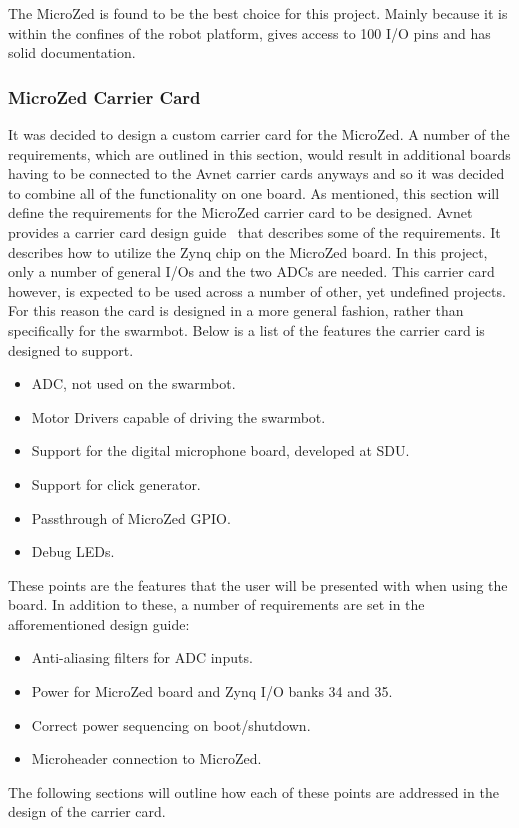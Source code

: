 The MicroZed is found to be the best choice for this project.
Mainly because it is within the confines of the robot platform, gives access to 100 I/O pins and has solid documentation.

\subsubsection*{MicroZed Carrier Card}
It was decided to design a custom carrier card for the MicroZed.
A number of the requirements, which are outlined in this section, would result in additional boards having to be connected to the Avnet carrier cards anyways and so it was decided to combine all of the functionality on one board.
As mentioned, this section will define the requirements for the MicroZed carrier card to be designed.
Avnet provides a carrier card design guide~\cite{design_carrier} that describes some of the requirements.
It describes how to utilize the Zynq chip on the MicroZed board.
In this project, only a number of general I/Os and the two ADCs are needed.
This carrier card however, is expected to be used across a number of other, yet undefined projects.
For this reason the card is designed in a more general fashion, rather than specifically for the swarmbot.
Below is a list of the features the carrier card is designed to support.

\begin{itemize}
	\item ADC, not used on the swarmbot.
	\item Motor Drivers capable of driving the swarmbot.
	\item Support for the digital microphone board, developed at SDU.
	\item Support for click generator.
	\item Passthrough of MicroZed GPIO.
	\item Debug LEDs.
\end{itemize}

These points are the features that the user will be presented with when using the board.
In addition to these, a number of requirements are set in the afforementioned design guide:

\begin{itemize}
	\item Anti-aliasing filters for ADC inputs.
	\item Power for MicroZed board and Zynq I/O banks 34 and 35.
	\item Correct power sequencing on boot/shutdown.
	\item Microheader connection to MicroZed.
\end{itemize}

The following sections will outline how each of these points are addressed in the design of the carrier card.
